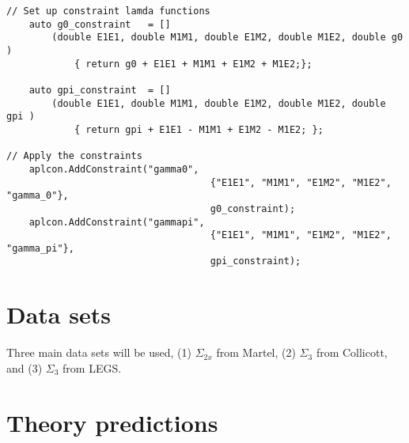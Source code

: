 \documentclass[]{article}
\begin{document}
\begin{lstlisting}
// Set up constraint lamda functions
    auto g0_constraint   = [] 
	    (double E1E1, double M1M1, double E1M2, double M1E2, double g0 )
		    { return g0 + E1E1 + M1M1 + E1M2 + M1E2;};
		    
    auto gpi_constraint  = [] 
	    (double E1E1, double M1M1, double E1M2, double M1E2, double gpi )
		    { return gpi + E1E1 - M1M1 + E1M2 - M1E2; };
    
// Apply the constraints
    aplcon.AddConstraint("gamma0", 
								    {"E1E1", "M1M1", "E1M2", "M1E2", "gamma_0"},  
								    g0_constraint);
    aplcon.AddConstraint("gammapi",
								    {"E1E1", "M1M1", "E1M2", "M1E2", "gamma_pi"}, 
								    gpi_constraint);

\end{lstlisting}


\section{Data sets}
Three main data sets will be used, (1) $\Sigma_{2x}$ from Martel, (2) $\Sigma_{3}$  from Collicott, and (3) $\Sigma_{3}$  from LEGS.

\section{Theory predictions}
\end{document}
